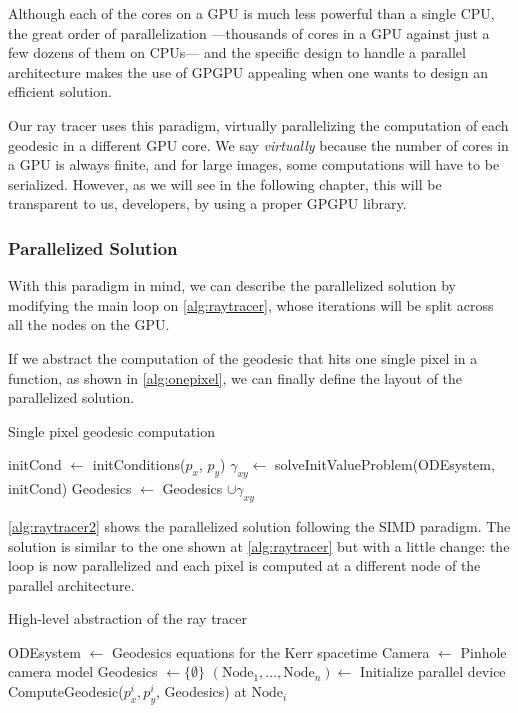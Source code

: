 Although each of the cores on a \ac{GPU} is much less powerful than a single \ac{CPU}, the great order of parallelization ---thousands of cores in a \ac{GPU} against just a few dozens of them on \acp{CPU}--- and the specific design to handle a parallel architecture makes the use of \ac{GPGPU} appealing when one wants to design an efficient solution.

Our ray tracer uses this paradigm, virtually parallelizing the computation of each geodesic in a different \ac{GPU} core. We say \emph{virtually} because the number of cores in a \ac{GPU} is always finite, and for large images, some computations will have to be serialized. However, as we will see in the following chapter, this will be transparent to us, developers, by using a proper \ac{GPGPU} library.

\subsubsection*{Parallelized Solution}

With this paradigm in mind, we can describe the parallelized solution by modifying the main loop on \autoref{alg:raytracer}, whose iterations will be split across all the nodes on the \ac{GPU}.

If we abstract the computation of the geodesic that hits one single pixel in a function, as shown in \autoref{alg:onepixel}, we can finally define the layout of the parallelized solution.

\begin{algorithm}[bth]
	\caption{Single pixel geodesic computation}
	\label{alg:onepixel}
	\begin{algorithmic}[1]
		\State initCond $\gets$ initConditions($p_x$, $p_y$)
		\State $\gamma_{xy} \gets$ solveInitValueProblem(ODEsystem, initCond)
		\State Geodesics $\gets$ Geodesics $\cup \gamma_{xy}$
		\EndFunction
	\end{algorithmic}
\end{algorithm}

\autoref{alg:raytracer2} shows the parallelized solution following the \ac{SIMD} paradigm. The solution is similar to the one shown at \autoref{alg:raytracer} but with a little change: the loop is now parallelized and each pixel is computed at a different node of the parallel architecture.

\begin{algorithm}
	\caption{High-level abstraction of the ray tracer}
	\label{alg:raytracer2}
	\begin{algorithmic}[1]
		\State ODEsystem $\gets$ Geodesics equations for the Kerr spacetime
		\State Camera $\gets$ Pinhole camera model
		\State Geodesics $\gets \{\emptyset\}$
		\State $(\textrm{Node}_1, \dots, \textrm{Node}_n) \gets$ Initialize parallel device
		\State ComputeGeodesic($p^i_x, p^i_y$, Geodesics) at $\textrm{Node}_i$
		\EndFor
		\EndFunction
	\end{algorithmic}
\end{algorithm}

